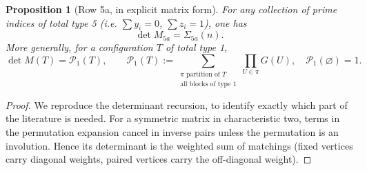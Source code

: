 \documentclass[11pt,a4paper]{article}
\newtheorem{proposition}[theorem]{Proposition}
\theoremstyle{definition}
\begin{document}
\begin{proposition}[Row 5a, in explicit matrix form]\label{prop:smith}
For any collection of prime indices of total type 5
(i.e. $\sum y_i=0$, $\sum z_i=1$), one has
\begin{equation}\label{eq:smith}
                         \det M_{5a}=\Sigma_{5a}(n).
\end{equation}
More generally, for a configuration $T$ of total type 1,
\[
 \det M(T)=\mathcal P_1(T),\qquad
 \mathcal P_1(T):=
 \sum_{\substack{\pi\text{ partition of }T\\
                  \text{all blocks of type 1}}}\prod_{U\in\pi}G(U),
 \quad \mathcal P_1(\varnothing)=1.
\]
\end{proposition}
\begin{proof}
We reproduce the determinant recursion, to identify exactly
which part of the literature is needed.  For a symmetric
matrix in characteristic two, terms in the permutation
expansion cancel in inverse pairs unless the permutation
is an involution.  Hence its determinant is the weighted
sum of matchings (fixed vertices carry diagonal weights,
paired vertices carry the off-diagonal weight).


\end{proof}
\end{document}
